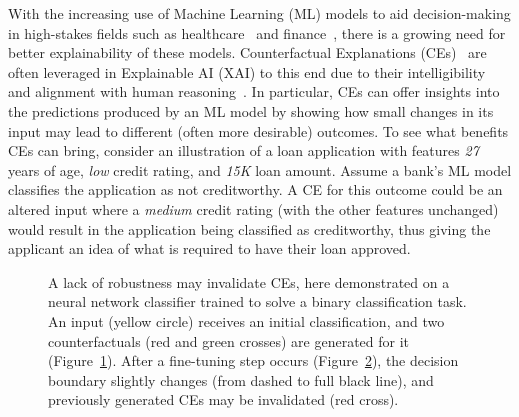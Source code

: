 
With the increasing use of Machine Learning (ML) models to aid decision-making in high-stakes fields such as healthcare~\cite{shaheen2021applications} and finance~\cite{cao2022ai}, there is a growing need for better explainability of these models. Counterfactual Explanations (CEs)~\cite{guidotti2024counterfactual} are often leveraged in Explainable AI (XAI) to this end due to their intelligibility and alignment with human reasoning~\cite{Miller_19,Byrne19}. In particular, CEs can offer insights into the predictions produced by an ML model by showing how small changes in its input may lead to different (often more desirable) outcomes. To see what benefits CEs can bring, consider an illustration of a loan application with features \emph{27} years of age, \emph{low} credit rating, and \emph{15K} loan amount. Assume a bank's ML model classifies the application as not creditworthy. A CE for this outcome could be an altered input where a \emph{medium} credit rating (with the other features unchanged) would result in the application being classified as creditworthy, thus giving the applicant an idea of what is required to have their loan approved.

\begin{figure}[t!]
    \begin{subfigure}[b]{0.23\textwidth} %
        \centering
        \caption{}
        \label{fig:sub1} %
    \end{subfigure}
    \hspace{0.1cm}
    \begin{subfigure}[b]{0.23\textwidth} %
        \centering
        \caption{}
        \label{fig:sub2} %
    \end{subfigure}
    \caption{A lack of robustness may invalidate CEs, here demonstrated on a neural network classifier trained to solve a binary classification task. An input (yellow circle) receives an initial classification, and two counterfactuals (red and green crosses) are generated for it (Figure~\ref{fig:sub1}). After a fine-tuning step occurs (Figure~\ref{fig:sub2}), the decision boundary slightly changes (from dashed to full black line), and previously generated CEs may be invalidated (red cross).}
    \label{fig:main} %
\end{figure}

